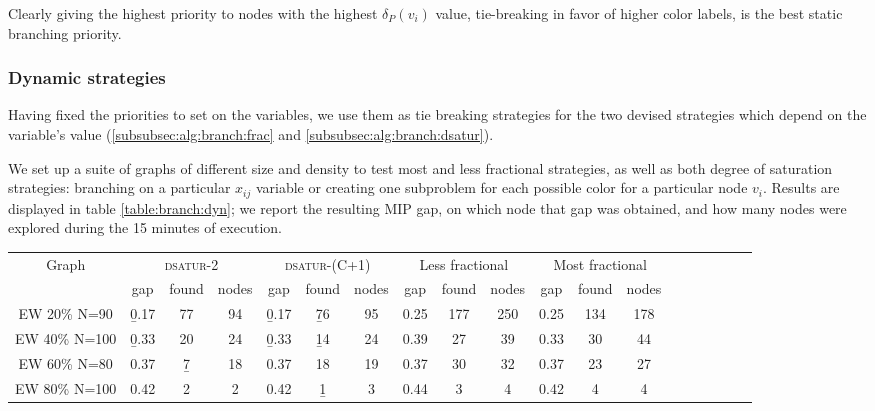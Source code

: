 Clearly giving the highest priority to nodes with the highest $\delta_P(v_i)$ value, tie-breaking in favor of higher color labels, is the best static branching priority.

\subsubsection{Dynamic strategies}

Having fixed the priorities to set on the variables, we use them as tie breaking strategies for the two devised strategies which depend on the variable's value (\ref{subsubsec:alg:branch:frac} and \ref{subsubsec:alg:branch:dsatur}). 

We set up a suite of graphs of different size and density to test most and less fractional strategies, as well as both degree of saturation strategies: branching on a particular $x_{ij}$ variable or creating one subproblem for each possible color for a particular node $v_i$. Results are displayed in table \ref{table:branch:dyn}; we report the resulting MIP gap, on which node that gap was obtained, and how many nodes were explored during the 15 minutes of execution.

\begin{sidewaystable}
\centering

\begin{tabular}{|c|ccc|ccc|ccc|ccc|ccc|ccc|}
\hline
\multicolumn{1}{|c|}{Graph} & \multicolumn{3}{|c|}{\textsc{dsatur-2}} & \multicolumn{3}{|c|}{\textsc{dsatur-(C+1)}} & \multicolumn{3}{|c|}{Less fractional} & \multicolumn{3}{|c|}{Most fractional} 
\\
 & gap & found & nodes & gap & found & nodes & gap & found & nodes & gap & found & nodes
\\
\hline
EW 20\% N=90 & \b{0.17} & 77 & 94 & \b{0.17} & \b{76} & 95 & 0.25 & 177 & 250 & 0.25 & 134 & 178 
\\
EW 40\% N=100 & \b{0.33} & 20 & 24 & \b{0.33} & \b{14} & 24 & 0.39 & 27 & 39 & 0.33 & 30 & 44 
\\
EW 60\% N=80 & 0.37 & \b{7} & 18 & 0.37 & 18 & 19 & 0.37 & 30 & 32 & 0.37 & 23 & 27 
\\
EW 80\% N=100 & 0.42 & 2 & 2 & 0.42 & \b{1} & 3 & 0.44 & 3 & 4 & 0.42 & 4 & 4
\\
\hline 
 \end{tabular}

\caption{Results for fractional and degree of saturation (spanning either $2$ or $C+1$ subproblems) branching strategies on branch and bound schemes. Data reported is MIP gap after $15$ minutes of execution, on which node (in thousands) that gap was found, and how many nodes (in thousands) were explored in total.}
\label{table:branch:dyn}

\end{sidewaystable}

